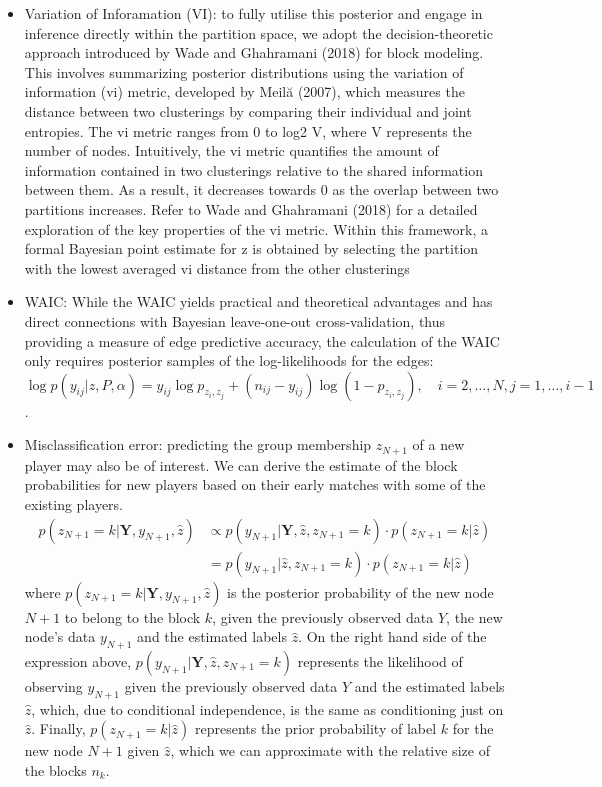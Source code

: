 \documentclass[11pt]{amsart}
\begin{document}
\begin{itemize}
\item Variation of Inforamation (VI): to fully utilise this posterior and engage in inference directly within the partition space, we adopt the decision-theoretic approach introduced by Wade and Ghahramani (2018) for block modeling. This involves summarizing posterior distributions using the variation of information (vi) metric, developed by Meilă (2007), which measures the distance between two clusterings by comparing their individual and joint entropies. The vi metric ranges from 0 to log2 V, where V represents the number of nodes. Intuitively, the vi metric quantifies the amount of information contained in two clusterings relative to the shared information between them. As a result, it decreases towards 0 as the overlap between two partitions increases. Refer to Wade and Ghahramani (2018) for a detailed exploration of the key properties of the vi metric. Within this framework, a formal Bayesian point estimate for z is obtained by selecting the partition with the lowest averaged vi distance from the other clusterings
\item WAIC: While the WAIC yields practical and theoretical advantages  and has direct connections with Bayesian leave-one-out cross-validation, thus providing a measure of edge predictive accuracy, the calculation of the WAIC only requires posterior samples of the log-likelihoods for the edges:$
\log p(y_{ij} | z, P, \alpha) = y_{ij} \log p_{z_i, z_j} + (n_{ij}- y_{ij}) \log(1 - p_{z_i, z_j}), \quad i = 2, \ldots, N,  j = 1, \ldots, i - 1$.

\item Misclassification error: predicting the group membership $z_{N+1}$ of a new player may also be of interest. We can derive the estimate of the block probabilities for new players based on their early matches with some of the existing players.
\begin{align}
p(z_{N+1} = k | \textbf{Y}, y_{N+1}, \hat{z}) &\propto p(y_{N+1} | \textbf{Y}, \hat{z}, z_{N+1} = k ) \cdot p(z_{N+1} = k | \hat{z}) \nonumber \\
&= p(y_{N+1} | \hat{z}, z_{N+1} = k ) \cdot p(z_{N+1} = k | \hat{z})
\end{align}
where $p(z_{N+1} = k | \textbf{Y}, y_{N+1}, \hat{z})$ is the posterior probability of the new node $N+1$ to belong to the block $k$, given the previously observed data $Y$, the new node's data $y_{N+1}$ and the estimated labels $\hat{z}$. On the right hand side of the expression above, $p(y_{N+1} | \textbf{Y}, \hat{z}, z_{N+1} = k )$ represents the likelihood of observing $y_{N+1}$ given the previously observed data $Y$ and the estimated labels $\hat{z}$, which, due to conditional independence, is the same as conditioning just on $\hat{z}$. Finally, $p(z_{N+1} = k | \hat{z})$ represents the prior probability of label $k$ for the new node $N+1$ given $\hat{z}$, which we can approximate with the relative size of the blocks $n_k$.
\end{itemize}
\end{document}
